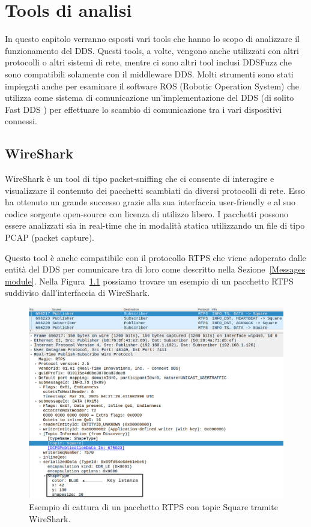 \chapter{Tools di analisi}
\label{chtools}

In questo capitolo verranno esposti vari tools che hanno lo 
scopo di analizzare il funzionamento del DDS.
Questi tools,
a volte,
vengono anche utilizzati con altri protocolli o 
altri sistemi di rete, mentre ci sono altri tool inclusi DDSFuzz 
che sono compatibili solamente con il middleware DDS. Molti 
strumenti sono stati impiegati anche per esaminare il 
software ROS (Robotic Operation System) che utilizza come 
sistema di comunicazione un'implementazione del DDS 
(di solito Fast DDS \cite{FastDDS}) per effettuare lo scambio 
di comunicazione tra i vari dispositivi connessi.

\section{WireShark}
WireShark è un tool di tipo packet-sniffing che ci consente di 
interagire e visualizzare il contenuto dei pacchetti scambiati da 
diversi protocolli di rete. Esso ha ottenuto un grande successo 
grazie alla sua interfaccia user-friendly e al suo codice sorgente 
open-source con licenza di utilizzo libero. I pacchetti possono 
essere analizzati sia in real-time che in modalità statica utilizzando 
un file di tipo PCAP (packet capture). 

Questo tool è anche compatibile con il protocollo RTPS che viene
adoperato dalle entità del DDS per comunicare tra di loro 
come descritto nella Sezione~\ref{Messages module}. 
Nella Figura~\ref{wireskartshapesdemo} possiamo trovare 
un esempio di un pacchetto RTPS suddiviso dall'interfaccia di 
WireShark.
\begin{figure}[H]
    \centering
    \includegraphics[width=15.2cm, keepaspectratio]{img/Info_ts e info_DST-Pagina-4.jpg}
    \caption{Esempio di cattura di un pacchetto RTPS con topic 
    Square tramite WireShark.}
    \label{wireskartshapesdemo}
\end{figure}

